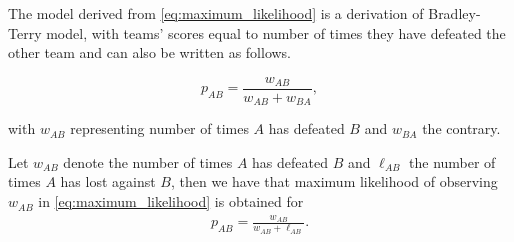 The model derived from \eqref{eq:maximum_likelihood} is a derivation of Bradley-Terry model, with teams' scores equal to number of times they have defeated the other team and can also be written as follows.

\begin{equation*}
\label{eq:mle_derived}
p_{AB} = \frac{w_{AB}}{w_{AB} + w_{BA}},
\end{equation*}

\noindent with $w_{AB}$ representing number of times $A$ has defeated $B$ and $w_{BA}$ the contrary.

\begin{proposition}
Let $w_{AB}$ denote the number of times $A$ has defeated $B$ and $\ell_{AB}$ the number of times $A$ has lost against $B$, then we have that maximum likelihood of observing $w_{AB}$ in \eqref{eq:maximum_likelihood} is obtained for
\begin{align*}
p_{AB} = \frac{w_{AB}}{w_{AB} + \ell_{AB}}.
\end{align*}
\end{proposition}


